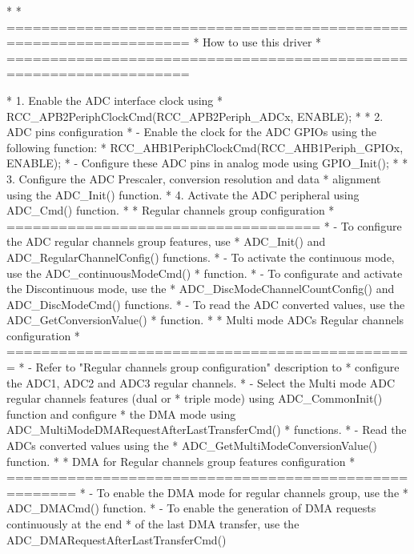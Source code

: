 \begin{DoxyVerb}*
*          ===================================================================
*                                   How to use this driver
*          ===================================================================

*          1.  Enable the ADC interface clock using 
*                  RCC_APB2PeriphClockCmd(RCC_APB2Periph_ADCx, ENABLE); 
*     
*          2. ADC pins configuration
*               - Enable the clock for the ADC GPIOs using the following function:
*                   RCC_AHB1PeriphClockCmd(RCC_AHB1Periph_GPIOx, ENABLE);   
*                - Configure these ADC pins in analog mode using GPIO_Init();  
*
*          3. Configure the ADC Prescaler, conversion resolution and data 
*              alignment using the ADC_Init() function.
*          4. Activate the ADC peripheral using ADC_Cmd() function.
*
*          Regular channels group configuration
*          ====================================    
*            - To configure the ADC regular channels group features, use 
*              ADC_Init() and ADC_RegularChannelConfig() functions.
*            - To activate the continuous mode, use the ADC_continuousModeCmd()
*              function.
*            - To configurate and activate the Discontinuous mode, use the 
*              ADC_DiscModeChannelCountConfig() and ADC_DiscModeCmd() functions.
*            - To read the ADC converted values, use the ADC_GetConversionValue()
*              function.
*
*          Multi mode ADCs Regular channels configuration
*          ===============================================
*            - Refer to "Regular channels group configuration" description to
*              configure the ADC1, ADC2 and ADC3 regular channels.        
*            - Select the Multi mode ADC regular channels features (dual or 
*              triple mode) using ADC_CommonInit() function and configure 
*              the DMA mode using ADC_MultiModeDMARequestAfterLastTransferCmd() 
*              functions.        
*            - Read the ADCs converted values using the 
*              ADC_GetMultiModeConversionValue() function.
*
*          DMA for Regular channels group features configuration
*          ====================================================== 
*           - To enable the DMA mode for regular channels group, use the 
*             ADC_DMACmd() function.
*           - To enable the generation of DMA requests continuously at the end
*             of the last DMA transfer, use the ADC_DMARequestAfterLastTransferCmd() 

\end{DoxyVerb}
